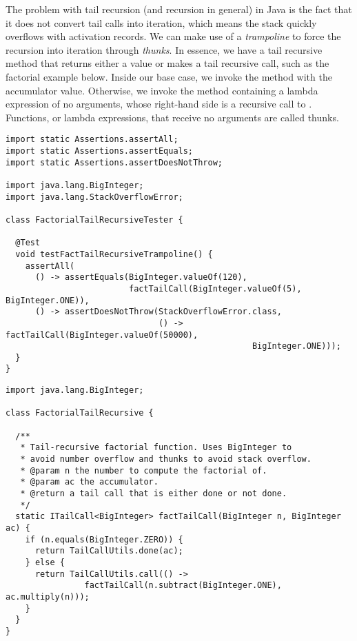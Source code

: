 The problem with tail recursion (and recursion in general) in Java is the fact that it does not convert tail calls into iteration, which means the stack quickly overflows with activation records. We can make use of a \emph{trampoline} to force the recursion into iteration through \emph{thunks}. In essence, we have a tail recursive method that returns either a value or makes a tail recursive call, such as the factorial example below. Inside our base case, we invoke the  method with the accumulator value. Otherwise, we invoke the  method containing a lambda expression of no arguments, whose right-hand side is a recursive call to . Functions, or lambda expressions, that receive no arguments are called thunks.

\enlargethispage{4\baselineskip}
\begin{lstlisting}[language=MyJava]
import static Assertions.assertAll;
import static Assertions.assertEquals;
import static Assertions.assertDoesNotThrow;

import java.lang.BigInteger;
import java.lang.StackOverflowError;

class FactorialTailRecursiveTester {
  
  @Test 
  void testFactTailRecursiveTrampoline() {
    assertAll(
      () -> assertEquals(BigInteger.valueOf(120), 
                         factTailCall(BigInteger.valueOf(5), BigInteger.ONE)),
      () -> assertDoesNotThrow(StackOverflowError.class,
                               () -> factTailCall(BigInteger.valueOf(50000), 
                                                  BigInteger.ONE)));
  }
}
\end{lstlisting}

\newpage %
\begin{lstlisting}[language=MyJava]
import java.lang.BigInteger;

class FactorialTailRecursive {
 
  /**
   * Tail-recursive factorial function. Uses BigInteger to 
   * avoid number overflow and thunks to avoid stack overflow.
   * @param n the number to compute the factorial of.
   * @param ac the accumulator.
   * @return a tail call that is either done or not done.
   */
  static ITailCall<BigInteger> factTailCall(BigInteger n, BigInteger ac) {
    if (n.equals(BigInteger.ZERO)) { 
      return TailCallUtils.done(ac); 
    } else {
      return TailCallUtils.call(() -> 
                factTailCall(n.subtract(BigInteger.ONE), ac.multiply(n)));
    }
  }
}
\end{lstlisting}

